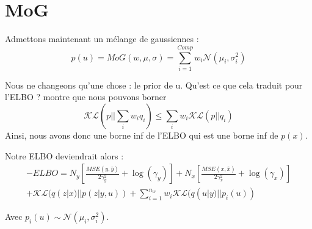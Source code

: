 \documentclass{article}
\begin{document}
\section{MoG}

Admettons maintenant un mélange de gaussiennes :
\begin{equation}
    p(u) = MoG(w, \mu, \sigma) = \sum_{i=1}^{Comp} w_i \mathcal{N}(\mu_i,\sigma_i^2)
\end{equation}

Nous ne changeons qu'une chose : le prior de u.
Qu'est ce que cela traduit pour l'ELBO ? 
\cite{hershey2007Approximating} montre que nous pouvons borner 
 \begin{equation*}
  \mathcal{KL}(p||\sum_i w_i q_i) \leq \sum_i w_i \mathcal{KL}(p||q_i)   
 \end{equation*}
 Ainsi, nous avons donc une borne inf de l'ELBO qui est une borne inf de $p(x)$.

Notre ELBO deviendrait alors :
\begin{multline}
    - ELBO = N_y\left[\frac{MSE(y,\hat{y})}{2\gamma_y^2} + \log(\gamma_y)\right] + N_x\left[\frac{MSE(x,\hat{x})}{2\gamma_x^2} + \log(\gamma_x)\right]\\ + \mathcal{KL}(q(z|x)||p(z|y,u)) + \sum_{i=1}^{n_w}w_i\mathcal{KL}(q(u|y)||p_i(u)) 
\end{multline}

Avec $p_i(u) \sim \mathcal{N}(\mu_i,\sigma_i^2)$.

\printbibliography
\end{document}
